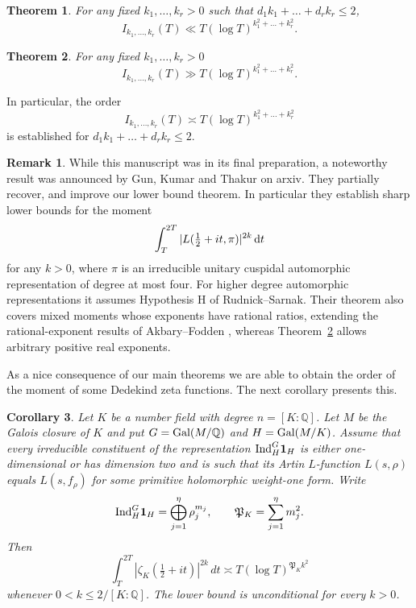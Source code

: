 \documentclass[oneside, 12pt]{amsart}
\newtheorem{thm}{Theorem}
\newtheorem{cor}[thm]{Corollary}
\theoremstyle{definition}
\newtheorem*{rem}{Remark}
\newcommand{\dt}{\, \textup{d}t}
\begin{document}
	\begin{thm}\label{mainThm1}
		For any fixed $k_1,\ldots,k_r>0$ such that $d_1k_1+\dots+d_rk_r \leq 2$,
		\[
		I_{k_1,\dots,k_r}(T) \ll
		T(\log T)^{k_1^2+\dots+k_r^2}.
		\]
	\end{thm}
	
	\begin{thm}\label{mainThm2}
		For any fixed $k_1,\dots,k_r>0$
		\[
		I_{k_1,\dots,k_r}(T)\gg
		T(\log T)^{k_1^2+\dots+k_r^2}.
		\]
	\end{thm}
	
	In particular, the order $$I_{k_1,\dots,k_r}(T)\asymp T(\log T)^{k_1^2+\dots+k_r^2}$$ is established for $d_1k_1+\dots+d_rk_r \leq 2$.
	
	\begin{rem}
		While this manuscript was in its final preparation, a noteworthy result was announced by Gun, Kumar and Thakur \cite{GunKumarThakur} on arxiv. They partially recover, and improve our lower bound theorem. In particular they establish sharp lower bounds for the moment $$\int_T^{2T} |L(\tfrac12+it,\pi)|^{2k} \dt$$ for any $k>0$, where $\pi$ is an irreducible unitary cuspidal
		automorphic representation of degree at most four. For higher degree automorphic representations it assumes Hypothesis H of Rudnick--Sarnak.  Their theorem also covers mixed moments whose exponents have rational
		ratios, extending the rational-exponent results of
		Akbary--Fodden \cite{AkbaryFodden1}, whereas
		Theorem~\ref{mainThm2} allows arbitrary positive real exponents.
	\end{rem}

	As a nice consequence of our main theorems we are able to obtain the order of the moment of some Dedekind zeta functions. The next corollary presents this.
	
	\begin{cor}\label{dedekindZetaCorollary}
		Let $K$ be a number field with degree $n=[K:\mathbb{Q}]$. Let $M$ be the Galois closure of $K$ and put $G=\textup{Gal}(M/\mathbb{Q})$ and $H=\textup{Gal}(M/K)$. Assume that every  irreducible constituent of the representation $\textup{Ind}_{H}^G \mathbf{1}_H$ is either one-dimensional or has dimension two and is such that its Artin $L$-function $L(s,\rho)$ equals $L(s,f_\rho)$ for some primitive holomorphic weight-one form. Write $$\textup{Ind}_{H}^G \mathbf{1}_H = \bigoplus_{j=1}^{\eta} \rho_j^{m_j}, \qquad \mathfrak{P}_K = \sum_{j=1}^{\eta} m_j^2.$$  Then
		\[
		\int_T^{2T}|\zeta_K(\tfrac12+it)|^{2k}\,dt
		\asymp T(\log T)^{\mathfrak P_Kk^2}
		\]
		whenever
		$0<k\leq2/[K:\mathbb Q]$.
		The lower bound is unconditional for every $k>0$.
	\end{cor}
	
\end{document}
